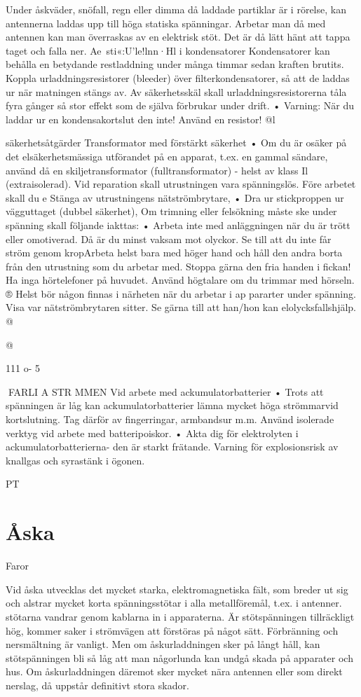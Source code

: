 \documentclass[a4paper,twoside,twocolumn,openright]{book}
\begin{document}
{{{{{Under åskväder, snöfall, regn eller dimma
då laddade partiklar är i rörelse, kan antennerna laddas upp till höga statiska spänningar. Arbetar man då med antennen kan man
överraskas av en elektrisk stöt. Det är då lätt
hänt att tappa taget och falla ner.
Ae~sti«:U'le!lnn·Hl i kondensatorer
Kondensatorer kan behålla en betydande
restladdning under många timmar sedan
kraften brutits.
Koppla urladdningsresistorer (bleeder)
över filterkondensatorer, så att de laddas
ur när matningen stängs av. Av säkerhetsskäl skall urladdningsresistorerna tåla
fyra gånger så stor effekt som de själva
förbrukar under drift.
• Varning: När du laddar ur en kondensakortslut den inte! Använd en resistor!
@l

säkerhetsåtgärder
Transformator med förstärkt säkerhet
• Om du är osäker på det elsäkerhetsmässiga utförandet på en apparat, t.ex. en
gammal sändare, använd då en skiljetransformator (fulltransformator) - helst
av klass Il (extraisolerad).
Vid reparation skall utrustningen vara spänningslös. Före arbetet skall du
e
Stänga av utrustningens nätströmbrytare,
• Dra ur stickproppen ur vägguttaget (dubbel säkerhet),
Om trimning eller felsökning måste ske under spänning skall följande iakttas:
• Arbeta inte med anläggningen när du är
trött eller omotiverad. Då är du minst
vaksam mot olyckor.
Se till att du inte får ström genom kropArbeta helst bara med höger hand
och håll den andra borta från den utrustning som du arbetar med. Stoppa gärna
den fria handen i fickan!
Ha inga hörtelefoner på huvudet. Använd
högtalare om du trimmar med hörseln.
®
Helst bör någon finnas i närheten när du
arbetar i ap pararter under spänning. Visa
var nätströmbrytaren sitter. Se gärna till
att han/hon kan elolycksfallshjälp.
@

@

111 o- 5

FARLI A STR MMEN
Vid arbete med ackumulatorbatterier
• Trots att spänningen är låg kan ackumulatorbatterier lämna mycket höga strömmarvid kortslutning. Tag därför av fingerringar, armbandsur m.m. Använd isolerade verktyg vid arbete med batteripoiskor.
• Akta dig för elektrolyten i ackumulatorbatterierna- den är starkt frätande.
Varning för explosionsrisk av knallgas
och syrastänk i ögonen.

PT
\section{Åska}
Faror

Vid åska utvecklas det mycket starka,
elektromagnetiska fält, som breder ut sig
och alstrar mycket korta spänningsstötar i
alla metallföremål, t.ex. i antenner. stötarna
vandrar genom kablarna in i apparaterna. Är
stötspänningen tillräckligt hög, kommer saker i strömvägen att förstöras på något sätt.
Förbränning och nersmältning är vanligt.
Men om åskurladdningen sker på långt håll,
kan stötspänningen bli så låg att man någorlunda kan undgå skada på apparater och
hus. Om åskurladdningen däremot sker
mycket nära antennen eller som direkt nerslag, då uppstår definitivt stora skador.

}}}}}
\end{document}
